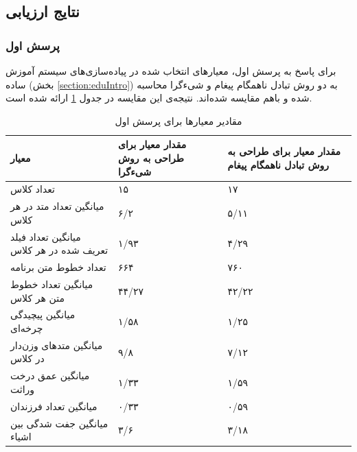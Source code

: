 \subsection{نتایج ارزیابی}
\subsubsection{پرسش اول}
برای پاسخ به پرسش اول، معیارهای انتخاب شده در پیاده‌سازی‌های سیستم آموزش ساده (بخش \ref{section:eduIntro}) به دو روش تبادل ناهمگام پیغام و شیءگرا محاسبه شده و باهم مقایسه شده‌اند. نتیجه‌ی این مقایسه در جدول \ref{table:mod_result_1} ارائه شده است.


\begin{table}[ht]
\small
\begin{center}
\begin{tabular}{|p{7cm}|p{4cm}|p{4cm}|}
	\hline
\textbf{معیار} & \textbf{مقدار معیار برای طراحی به روش شیءگرا} & \textbf{مقدار معیار برای طراحی به روش تبادل ناهمگام پیغام} 
\\ 
	\hline
	تعداد کلاس
	 &
	 ۱۵
	 &
 ۱۷
\\
	\hline
	میانگین تعداد متد در هر کلاس
	 &
	 ۶/۲
	 &
	 ۵/۱۱
\\
	\hline
	میانگین تعداد فیلد تعریف شده در هر کلاس
	 &
	 ۱/۹۳
	 &
	 ۴/۲۹
\\
	\hline

	تعداد خطوط متن برنامه
	 &
	 ۶۶۴
	 &
	 ۷۶۰
\\
	\hline
	
		میانگین تعداد خطوط متن هر کلاس
	 &
	 ۴۴/۲۷
	 &
	 ۴۲/۲۲
\\
	\hline
	
		میانگین پیچیدگی چرخه‌ای
	 &
	 ۱/۵۸
	 &
	 ۱/۲۵
\\
	\hline
	
		میانگین متدهای وزن‌دار در کلاس
	 &
	 ۹/۸
	 &
	 ۷/۱۲
\\
	\hline
	
		میانگین عمق درخت وراثت
	 &
	 ۱/۳۳
	 &
	 ۱/۵۹
\\
	\hline
	
		میانگین تعداد فرزندان
	 &
	 ۰/۳۳
	 &
	 ۰/۵۹
\\
	\hline
	
			میانگین جفت شدگی بین اشیاء
	 &
	 ۳/۶
	 &
	 ۳/۱۸
\\
	\hline
\end{tabular}
\caption{\label{table:mod_result_1} مقادیر معیارها برای پرسش اول}
\end{center}
\end{table}
\FloatBarrier
